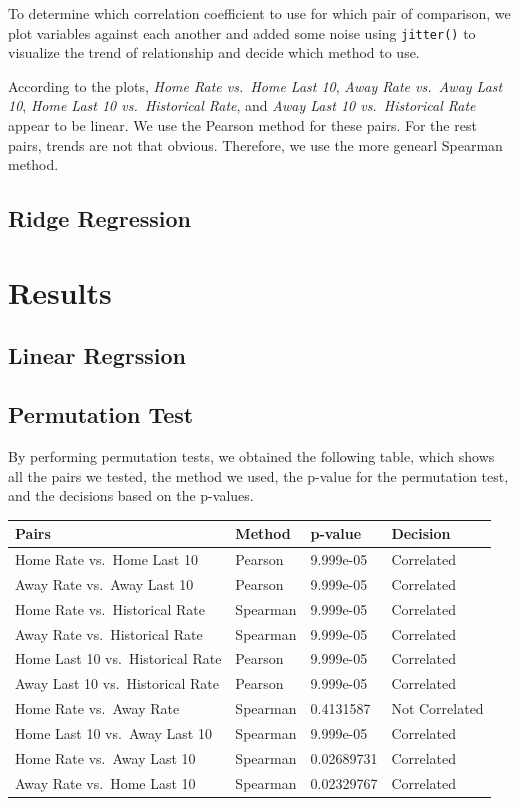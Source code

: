 \documentclass[]{article}
\begin{document}
To determine which correlation coefficient to use for which pair of
comparison, we plot variables against each another and added some noise
using \texttt{jitter()} to visualize the trend of relationship and
decide which method to use.

According to the plots, \emph{Home Rate vs.~Home Last 10}, \emph{Away
Rate vs.~Away Last 10}, \emph{Home Last 10 vs.~Historical Rate}, and
\emph{Away Last 10 vs.~Historical Rate} appear to be linear. We use the
Pearson method for these pairs. For the rest pairs, trends are not that
obvious. Therefore, we use the more genearl Spearman method.

\subsection{Ridge Regression}\label{ridge-regression}

\section{Results}\label{results}

\subsection{Linear Regrssion}\label{linear-regrssion}

\subsection{Permutation Test}\label{permutation-test-1}

By performing permutation tests, we obtained the following table, which
shows all the pairs we tested, the method we used, the p-value for the
permutation test, and the decisions based on the p-values.

\begin{longtable}[]{@{}llll@{}}
\toprule
Pairs & Method & p-value & Decision\tabularnewline
\midrule
\endhead
Home Rate vs.~Home Last 10 & Pearson & 9.999e-05 &
Correlated\tabularnewline
Away Rate vs.~Away Last 10 & Pearson & 9.999e-05 &
Correlated\tabularnewline
Home Rate vs.~Historical Rate & Spearman & 9.999e-05 &
Correlated\tabularnewline
Away Rate vs.~Historical Rate & Spearman & 9.999e-05 &
Correlated\tabularnewline
Home Last 10 vs.~Historical Rate & Pearson & 9.999e-05 &
Correlated\tabularnewline
Away Last 10 vs.~Historical Rate & Pearson & 9.999e-05 &
Correlated\tabularnewline
Home Rate vs.~Away Rate & Spearman & 0.4131587 & Not
Correlated\tabularnewline
Home Last 10 vs.~Away Last 10 & Spearman & 9.999e-05 &
Correlated\tabularnewline
Home Rate vs.~Away Last 10 & Spearman & 0.02689731 &
Correlated\tabularnewline
Away Rate vs.~Home Last 10 & Spearman & 0.02329767 &
Correlated\tabularnewline
\bottomrule
\end{longtable}
\end{document}

